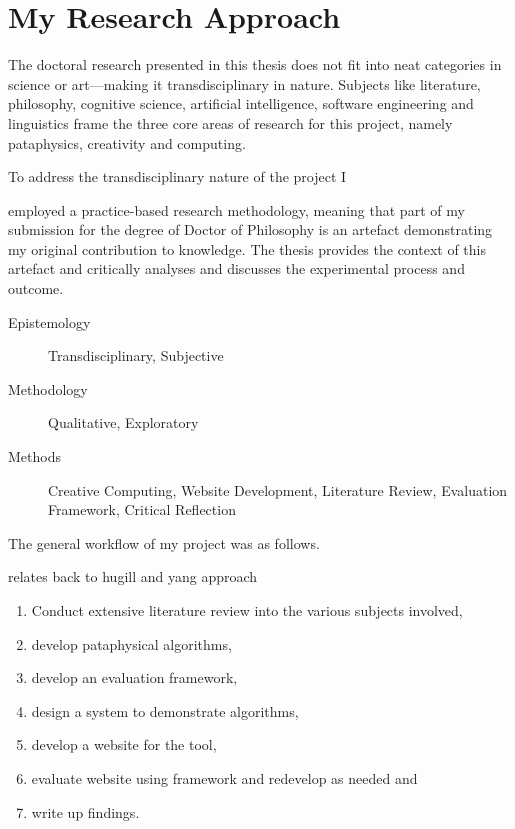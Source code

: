 \documentclass[11pt]{thesis} %
\begin{document}
\section{My Research Approach}
\label{s:mymeth}


The doctoral research presented in this thesis does not fit into neat categories in science or art---making it transdisciplinary in nature. Subjects like literature, philosophy, cognitive science, artificial intelligence, software engineering and linguistics frame the three core areas of research for this project, namely pataphysics, creativity and computing.

To address the transdisciplinary nature of the project I 


employed a practice-based research methodology, meaning that part of my submission for the degree of Doctor of Philosophy is an artefact demonstrating my original contribution to knowledge. The thesis provides the context of this artefact and critically analyses and discusses the experimental process and outcome.

\begin{description}
  \item [Epistemology] Transdisciplinary, Subjective
  \item [Methodology] Qualitative, Exploratory
  \item [Methods] Creative Computing, Website Development, Literature Review, Evaluation Framework, Critical Reflection
\end{description}

The general workflow of my project was as follows.
\begin{draft}
relates back to hugill and yang approach
\end{draft}

\begin{enumerate}
  \item Conduct extensive literature review into the various subjects involved,
  \item develop pataphysical algorithms,
  \item develop an evaluation framework,
  \item design a system to demonstrate algorithms,
  \item develop a website for the tool,
  \item evaluate website using framework and redevelop as needed and
  \item write up findings.
\end{enumerate}
\end{document}

